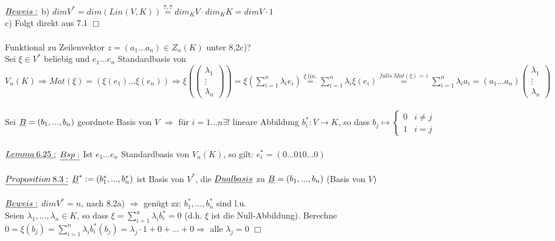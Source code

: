 \documentclass[fleqn, a4paper, 11pt]{scrartcl}
\theoremstyle{definition}
\begin{document}
\\
$\uline{Beweis:}$ b) $dim V^{\ast}=dim(Lin(V,K))\stackrel{7,7}{=}dim_K V\cdot dim_K K=dim V\cdot 1$\\
c) Folgt direkt aus 7.1 \hfill $\Box$\\
\\
Funktional zu Zeilenvektor $z=(a_1...a_n)\in Z_n(K)$ unter 8,2c)?\\
Sei $\xi \in V^{\ast}$ beliebig und $e_1...e_n$ Standardbasis von $V_n(K)\Rightarrow Mat(\xi)=(\xi(e_1)\dots \xi(e_n))\Rightarrow \xi(\begin{pmatrix}
	\lambda_1\\
	\vdots\\
	\lambda_n
\end{pmatrix})=\xi(\sum\limits_{i=1}^n \lambda_i e_i)\stackrel{\xi\:lin.}{=}\sum\limits_{i=1}^n \lambda_i \xi(e_i)\stackrel{falls\:Mat(\xi)=z}{=}\sum\limits_{i=1}^n \lambda_i a_i=(a_1...a_n)\begin{pmatrix}
	\lambda_1\\
	\vdots\\
	\lambda_n
\end{pmatrix}$\\
\\
Sei $\uline{B}=(b_1,...,b_n)$ geordnete Basis von $V$ $\Rightarrow$ für $i=1...n\exists!$ lineare Abbildung $b_i^{\ast}:V\rightarrow K$, so dass $b_j\mapsto \begin{cases}
	0 & i\neq j\\
	1 & i=j
\end{cases}$\\
\\
$\uline{Lemma\:6.25:}$ $\uline{Bsp:}$ Ist $e_1...e_n$ Standardbasis von $V_n(K)$, so gilt: $e_i^{\ast}=(0\dots 010\dots 0)$\\
\\
$\uline{Proposition\:8.3:}$ $\uline{B}^{\ast}:=(b_1^{\ast},...,b_n^{\ast})$ ist Basis von $V^{\ast}$, die $\uline{Dualbasis}$ zu $\uline{B}=(b_1,...,b_n)$ (Basis von $V$)\\
\\
$\uline{Beweis:}$ $dim V^{\ast}=n$, nach 8.2a) $\Rightarrow$ genügt zz: $b_1^{\ast},...,b_n^{\ast}$ sind l.u.\\
Seien $\lambda_1,...,\lambda_n\in K$, so dass $\xi=\sum\limits_{i=1}^n \lambda_i b_i^{\ast}=0$ (d.h. $\xi$ ist die Null-Abbildung). Berechne $0=\xi(b_j)=\sum\limits_{i=1}^n \lambda_i b_i^{\ast}(b_j)=\lambda_j\cdot 1+0+...+0\Rightarrow $ alle $\lambda_j=0$ \hfill $\Box$\\
\end{document}
